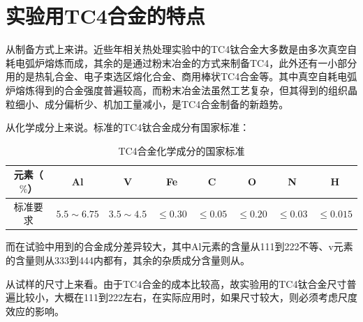 \documentclass[
class = book,
zihao = -4,
font = noto,
paper = a4paper,
openany
]{easybook}
\begin{document}
%
%
\section{实验用TC4合金的特点}
从制备方式上来讲。近些年相关热处理实验中的TC4钛合金大多数是由{多次真空自耗电弧炉熔炼}\cite{renchiqiangGurongshixiaoduiTC4taihejinxianweizuzhihelixuexingnengdeyingxiang2022,ranxingGurongwenduduiTi6Al4VELItaihejinxianweizuzhijixingnengdeyingxiang2021,lilouGurongshixiaoduiTC4hejinzuzhiyujixiexingnengdeyingxiang2014,jingranGurongshixiaoduiTC4hejinzuzhiyuxingnengdeyingxiang2018}而成，其余的是通过粉末冶金\cite{zhanghaoyinGurongShixiaoduiTC4taihejinzuzhihelixuexingnengdeyingxiang2014,xujianGurongshixiaogongyiduiTC4taihejinzuzhijixingnengdeyingxiang2014}的方式来制备TC4，此外还有一小部分用的是热轧合金\cite{LiuWanYingBuTongReChuLiGongYiDuiTi6Al4VTaiHeJinWeiGuanJieGouHeLiXueXingNengYingXiangYingWen2017}、电子束选区熔化合金\cite{leijunleDianzishuxuanquronghuachengxingTC4hejinxianweizuzhiyuxingnengdeyanjiujinzhan2022}、商用棒状TC4合金\cite{luyuanyuanShixiaochuliduiTC4taihejinweiguanzuzhihelixuexingnengdeyingxiang2019,baoxuechunRechuligongyiduiTC4taihejinzuzhihelixuexingnengdeyingxiang2019}等。其中真空自耗电弧炉熔炼得到的合金强度普遍较高，而粉末冶金法虽然工艺复杂，但其得到的组织晶粒细小、成分偏析少、机加工量减小，是TC4合金制备的新趋势。

从化学成分上来说。标准的TC4钛合金成分有国家标准：
\begin{table}[htbp]
	\centering
	\label{sec:mytc4chem}
	\caption{TC4合金化学成分的国家标准}
	\begin{tabular}{cccccccc}
		\toprule
		元素（$ \% $） & Al & V &Fe &C& O& N &H \\ \midrule
		标准要求 &$ 5.5\sim 6.75 $ & $ 3.5\sim 4.5 $&$ \le 0.30 $ & $ \le 0.05 $&$ \le 0.20 $&$ \le 0.03$ &$ \le 0.015 $  \\ \bottomrule
	\end{tabular}
\end{table}
而在试验中用到的合金成分差异较大，其中Al元素的含量从111到222不等、v元素的含量则从333到444内都有，其余的杂质成分含量则从。


从试样的尺寸上来看。由于TC4合金的成本比较高，故实验用的TC4钛合金尺寸普遍比较小，大概在111到222左右，在实际应用时，如果尺寸较大，则必须考虑尺度效应的影响。
\end{document}
